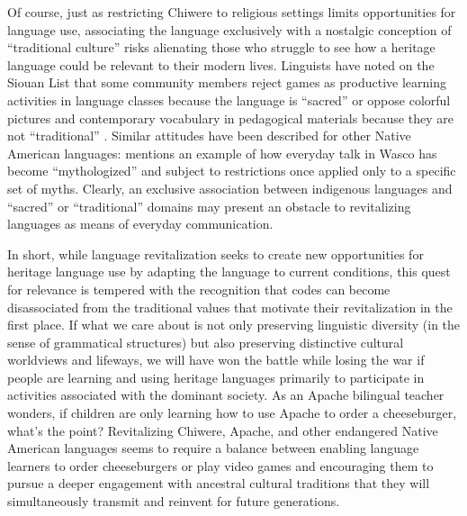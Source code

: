 \documentclass[output=paper]{LSP/langsci}
\begin{document}
Of course, just as restricting Chiwere to religious settings limits opportunities for language use, associating the language exclusively with a nostalgic conception of ``traditional culture'' risks alienating those who struggle to see how a heritage language could be relevant to their modern lives. Linguists have noted on the Siouan List that some community members reject games as productive learning activities in language classes because the language is ``sacred'' or oppose colorful pictures and contemporary vocabulary in pedagogical materials because they are not ``traditional'' \citep{deReuse2014b, Ullrich2014a, Ullrich2014b}. Similar attitudes have been described for other Native American languages:  mentions an example of how everyday talk in Wasco has become ``mythologized'' and subject to restrictions once applied only to a specific set of myths. Clearly, an exclusive association between indigenous languages and ``sacred'' or ``traditional'' domains may present an obstacle to revitalizing languages as means of everyday communication.

In short, while language revitalization seeks to create new opportunities for heritage language use by adapting the language to current conditions, this quest for relevance is tempered with the recognition that codes can become disassociated from the traditional values that motivate their revitalization in the first place. If what we care about is not only preserving linguistic diversity (in the sense of grammatical structures) but also preserving distinctive cultural worldviews and lifeways, we will have won the battle while losing the war if people are learning and using heritage languages primarily to participate in activities associated with the dominant society. As an Apache bilingual teacher wonders, if children are only learning how to use Apache to order a cheeseburger, what's the point? \citep[551]{Samuels2006} Revitalizing Chiwere, Apache, and other endangered Native American languages seems to require a balance between enabling language learners to order cheeseburgers or play video games and encouraging them to pursue a deeper engagement with ancestral cultural traditions that they will simultaneously transmit and reinvent for future generations.
\end{document}

